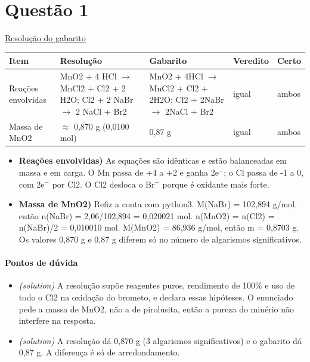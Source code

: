 \documentclass{article}%
\begin{document}
\section*{Questão 1}%
\href{https://poliedroresolve.sistemapoliedro.com.br/vestibulares/ime/2027/ime-2-fase-dia-3-28-10-2026-2-fase-dia-3/dissertativa-1-quimica-2-fase-dia-3-ime-2027}{Resolução do gabarito}\par\smallskip%
\begin{longtable}{@{}p{} p{} p{} p{} p{}@{}}\toprule Item & Resolução & Gabarito & Veredito & Certo \\ \midrule
Reações envolvidas & MnO2 + 4 HCl $\to$ MnCl2 + Cl2 + 2 H2O; Cl2 + 2 NaBr $\to$ 2 NaCl + Br2 & MnO2 + 4HCl $\to$ MnCl2 + Cl2 + 2H2O; Cl2 + 2NaBr $\to$ 2NaCl + Br2 & igual & ambos \\
Massa de MnO2 & $\approx$ 0,870 g (0,0100 mol) & 0,87 g & igual & ambos \\
\bottomrule\end{longtable}%
\begin{itemize}%
\item%
\textbf{Reações envolvidas)} As equações são idênticas e estão balanceadas em massa e em carga. O Mn passa de +4 a +2 e ganha 2e$^{-}$; o Cl passa de -1 a 0, com 2e$^{-}$ por Cl2. O Cl2 desloca o Br$^{-}$ porque é oxidante mais forte.%
\item%
\textbf{Massa de MnO2)} Refiz a conta com python3. M(NaBr) = 102,894 g/mol, então n(NaBr) = 2,06/102,894 = 0,020021 mol. n(MnO2) = n(Cl2) = n(NaBr)/2 = 0,010010 mol. M(MnO2) = 86,936 g/mol, então m = 0,8703 g. Os valores 0,870 g e 0,87 g diferem só no número de algarismos significativos.%
\end{itemize}%
\paragraph{Pontos de dúvida}%
\begin{itemize}%
\item%
\textit{(solution)} A resolução supõe reagentes puros, rendimento de 100\% e uso de todo o Cl2 na oxidação do brometo, e declara essas hipóteses. O enunciado pede a massa de MnO2, não a de pirolusita, então a pureza do minério não interfere na resposta.%
\item%
\textit{(solution)} A resolução dá 0,870 g (3 algarismos significativos) e o gabarito dá 0,87 g. A diferença é só de arredondamento.%
\end{itemize}%
\end{document}
